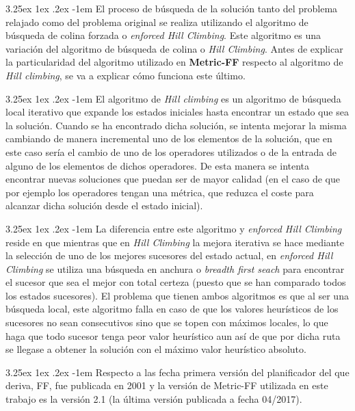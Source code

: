 \documentclass{article}
\makeatletter
\newcounter{subsubsubsection}
\renewcommand\paragraph{\@startsection{paragraph}{5}{\z@}%
  {3.25ex \@plus1ex \@minus.2ex}%
  {-1em}%
  {\normalfont\normalsize\bfseries}}
\makeatother
\begin{document}
\paragraph{}
El proceso de búsqueda de la solución tanto del problema relajado como del problema original se realiza utilizando el algoritmo de búsqueda de colina forzada o \textit{enforced Hill Climbing}. Este algoritmo es una variación del algoritmo de búsqueda de colina o \textit{Hill Climbing}. Antes de explicar la particularidad del algoritmo utilizado en \textbf{Metric-FF} respecto al algoritmo de \textit{Hill climbing}, se va a explicar cómo funciona este último.

\paragraph{}
El algoritmo de \textit{Hill climbing} es un algoritmo de búsqueda local iterativo que expande los estados iniciales hasta encontrar un estado que sea la solución. Cuando se ha encontrado dicha solución, se intenta mejorar la misma cambiando de manera incremental uno de los elementos de la solución, que en este caso sería el cambio de uno de los operadores utilizados o de la entrada de alguno de los elementos de dichos operadores. De esta manera se intenta encontrar nuevas soluciones que puedan ser de mayor calidad (en el caso de que por ejemplo los operadores tengan una métrica, que reduzca el coste para alcanzar dicha solución desde el estado inicial).

\paragraph{}
La diferencia entre este algoritmo y \textit{enforced Hill Climbing} reside en que mientras que en \textit{Hill Climbing} la mejora iterativa se hace mediante la selección de uno de los mejores sucesores del estado actual, en \textit{enforced Hill Climbing} se utiliza una búsqueda en anchura o \textit{breadth first seach} para encontrar el sucesor que sea el mejor con total certeza (puesto que se han comparado todos los estados sucesores). El problema que tienen ambos algoritmos es que al ser una búsqueda local, este algoritmo falla en caso de que los valores heurísticos de los sucesores no sean consecutivos sino que se topen con máximos locales, lo que haga que todo sucesor tenga peor valor heurístico aun así de que por dicha ruta se llegase a obtener la solución con el máximo valor heurístico absoluto.


\paragraph{}
Respecto a las fecha primera versión del planificador del que deriva, FF, fue publicada en 2001 y la versión de Metric-FF utilizada en este trabajo es la versión 2.1 (la última versión publicada a fecha 04/2017).
\end{document}
